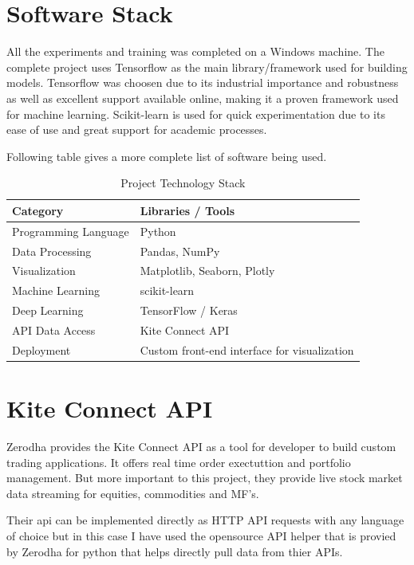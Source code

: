 \section{Software Stack}

All the experiments and training was completed on a Windows machine. The complete project uses Tensorflow as the main library/framework used for building models. Tensorflow was choosen due to its industrial importance and robustness as well as excellent support available online, making it a proven framework used for machine learning. Scikit-learn is used for quick experimentation due to its ease of use and great support for academic processes.

Following table gives a more complete list of software being used.

\begin{table}[h!]
    \centering
    \caption{Project Technology Stack}
    \label{tab:tech_stack}
    \begin{tabular}{|l|l|}
        \hline
        \textbf{Category} & \textbf{Libraries / Tools} \\
        \hline
        Programming Language & Python \\
        \hline
        Data Processing & Pandas, NumPy \\
        \hline
        Visualization & Matplotlib, Seaborn, Plotly \\
        \hline
        Machine Learning & scikit-learn \\
        \hline
        Deep Learning & TensorFlow / Keras \\
        \hline
        API Data Access & Kite Connect API \\
        \hline
        Deployment & Custom front-end interface for visualization \\
        \hline
    \end{tabular}
\end{table}

\section{Kite Connect API}

Zerodha provides the Kite Connect API as a tool for developer to build custom trading applications. It offers real time order exectuttion and portfolio management. But more important to this project, they provide live stock market data streaming for equities, commodities and MF's.

Their api can be implemented directly as HTTP API requests with any language of choice but in this case I have used the opensource API helper that is provied by Zerodha for python that helps directly pull data from thier APIs.

